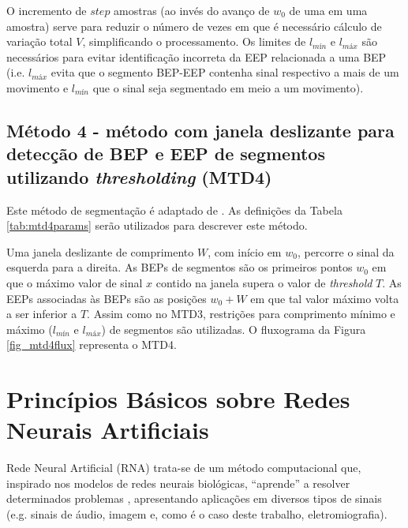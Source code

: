 O incremento de $step$ amostras (ao invés do avanço de $w_0$ de uma em uma amostra) serve para reduzir o número de vezes em que é necessário cálculo de variação total $V$, simplificando o processamento. Os limites de $l_{mín}$ e $l_{máx}$ são necessários para evitar identificação incorreta da EEP relacionada a uma BEP (i.e. $l_{máx}$ evita que o segmento BEP-EEP contenha sinal respectivo a mais de um movimento e $l_{mín}$ que o sinal seja segmentado em meio a um movimento).

			\subsection{Método 4 - método com janela deslizante para detecção de BEP e EEP de segmentos utilizando \emph{thresholding} (MTD4)}
Este método de segmentação é adaptado de . As definições da Tabela \ref{tab:mtd4params} serão utilizados para descrever este método.



Uma janela deslizante de comprimento $W$, com início em $w_0$, percorre o sinal da esquerda para a direita. As BEPs de segmentos são os primeiros pontos $w_0$ em que o máximo valor de sinal $x$ contido na janela supera o valor de \emph{threshold} $T$. As EEPs associadas às BEPs são as posições $w_0 + W$ em que tal valor máximo volta a ser inferior a $T$. Assim como no MTD3, restrições para comprimento mínimo e máximo ($l_{mín}$ e $l_{máx}$) de segmentos são utilizadas. O fluxograma da Figura \ref{fig_mtd4flux} representa o MTD4.



		\section{Princípios Básicos sobre Redes Neurais Artificiais}
Rede Neural Artificial (RNA) trata-se de um método computacional que, inspirado nos modelos de redes neurais biológicas, ``aprende'' a resolver determinados problemas \cite{YEGNANARAYANA2009}, apresentando aplicações em diversos tipos de sinais (e.g. sinais de áudio, imagem e, como é o caso deste trabalho, eletromiografia).

